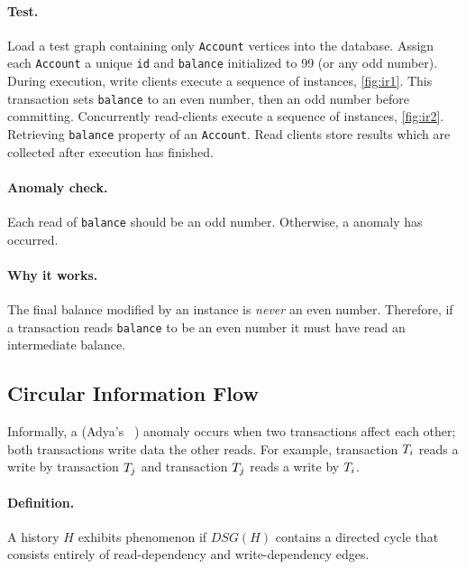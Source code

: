 \paragraph{Test.}
Load a test graph containing only \texttt{Account} vertices into the database.
Assign each \texttt{Account} a unique \texttt{id} and \texttt{balance}
initialized to 99 (or any odd number). During execution, write clients execute a
sequence of  instances, \autoref{fig:ir1}. This
transaction sets \texttt{balance} to an even number, then an odd number before
committing. Concurrently read-clients execute a sequence of
 instances, \autoref{fig:ir2}. Retrieving
\texttt{balance} property of an \texttt{Account}. Read clients store results
which are collected after execution has finished.

\paragraph{Anomaly check.}
Each read of \texttt{balance} should be an odd number.
Otherwise, a  anomaly has occurred.

\paragraph{Why it works.}
The final balance modified by an  instance is
\emph{never} an even number. Therefore, if a transaction reads \texttt{balance}
to be an even number it must have read an intermediate balance.

\subsection*{Circular Information Flow}

Informally, a  (Adya's ~\cite{adya1999weak})
anomaly occurs when two transactions affect each other; \ie both transactions
write data the other reads. For example, transaction $T_i$ reads a
write by transaction $T_j$ and transaction $T_j$ reads a write by $T_i$.

\paragraph{Definition.}
A history $H$ exhibits phenomenon  if $\textit{DSG}(H)$ contains a
directed cycle that consists entirely of read-dependency and write-dependency edges.

